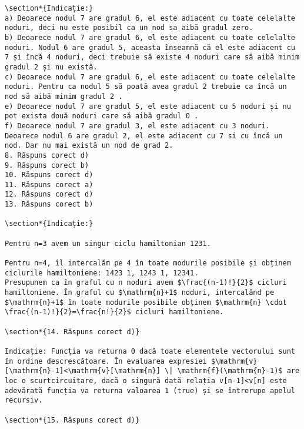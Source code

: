 \begin{verbatim}
\section*{Indicație:}
a) Deoarece nodul 7 are gradul 6, el este adiacent cu toate celelalte noduri, deci nu este posibil ca un nod sa aibă gradul zero.
b) Deoarece nodul 7 are gradul 6, el este adiacent cu toate celelalte noduri. Nodul 6 are gradul 5, aceasta înseamnă că el este adiacent cu 7 și încă 4 noduri, deci trebuie să existe 4 noduri care să aibă minim gradul 2 și nu există.
c) Deoarece nodul 7 are gradul 6, el este adiacent cu toate celelalte noduri. Pentru ca nodul 5 să poată avea gradul 2 trebuie ca încă un nod să aibă minim gradul 2 .
e) Deoarece nodul 7 are gradul 5, el este adiacent cu 5 noduri și nu pot exista două noduri care să aibă gradul 0 .
f) Deoarece nodul 7 are gradul 3, el este adiacent cu 3 noduri. Deoarece nodul 6 are gradul 2, el este adiacent cu 7 si cu încă un nod. Dar nu mai există un nod de grad 2.
8. Răspuns corect d)
9. Răspuns corect b)
10. Răspuns corect d)
11. Răspuns corect a)
12. Răspuns corect d)
13. Răspuns corect b)

\section*{Indicație:}

Pentru n=3 avem un singur ciclu hamiltonian 1231.

Pentru n=4, îl intercalăm pe 4 în toate modurile posibile și obținem ciclurile hamiltoniene: 1423 1, 1243 1, 12341.
Presupunem ca în graful cu n noduri avem $\frac{(n-1)!}{2}$ cicluri hamiltoniene. În graful cu $\mathrm{n}+1$ noduri, intercalând pe $\mathrm{n}+1$ în toate modurile posibile obținem $\mathrm{n} \cdot \frac{(n-1)!}{2}=\frac{n!}{2}$ cicluri hamiltoniene.

\section*{14. Răspuns corect d)}

Indicație: Funcția va returna 0 dacă toate elementele vectorului sunt în ordine descrescătoare. În evaluarea expresiei $\mathrm{v}[\mathrm{n}-1]<\mathrm{v}[\mathrm{n}] \| \mathrm{f}(\mathrm{n}-1)$ are loc o scurtcircuitare, dacă o singură dată relația v[n-1]<v[n] este adevărată funcția va returna valoarea 1 (true) și se întrerupe apelul recursiv.

\section*{15. Răspuns corect d)}


\end{verbatim}
